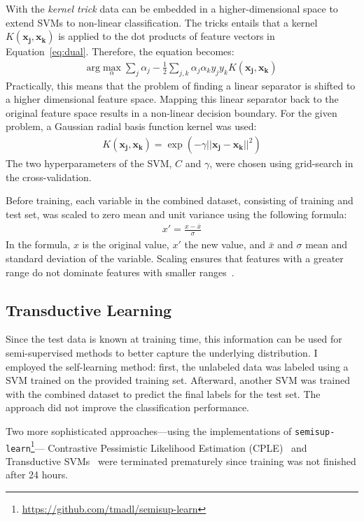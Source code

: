 \documentclass[a4paper,11pt]{article}
\begin{document}
With the \emph{kernel trick} data can be embedded in a
higher-dimensional space to extend SVMs to non-linear
classification. The tricks entails that a kernel
$K(\mathbf{x_j}, \mathbf{x_k})$ is applied to the dot products of
feature vectors in Equation~\ref{eq:dual}. Therefore, the equation
becomes:
\begin{align}
\label{eq:dualkernel}
  \text{arg}\max_\alpha\sum_j\alpha_j - \frac{1}{2}\sum_{j,k}\alpha_j\alpha_ky_jy_kK(\mathbf{x_j}, \mathbf{x_k})
\end{align} 
Practically, this means that the problem of finding a linear separator
is shifted to a higher dimensional feature space. Mapping this linear
separator back to the original feature space results in a non-linear
decision boundary.  For the given problem, a Gaussian radial basis
function kernel was used:
\begin{align}
K(\mathbf{x_j}, \mathbf{x_k}) = \exp(-\gamma||\mathbf{x_j} - \mathbf{x_k} ||^2)
\end{align}
The two hyperparameters of the SVM, $C$ and
$\gamma$,  were chosen using grid-search in the cross-validation.


Before training, each variable in the combined dataset, consisting of
training and test set, was scaled to zero mean and unit variance using
the following formula:
\begin{align}
  x' = \frac{x - \bar{x}}{\sigma}
\end{align}
In the formula, $x$ is the original value, $x'$ the new value, and
$\bar{x}$ and $\sigma$ mean and standard deviation of the
variable. Scaling ensures that features with a greater range do not
dominate features with smaller ranges~\cite{hsu2003practical}.

\subsection{Transductive Learning}

Since the test data is known at training time, this information can be
used for semi-supervised methods to better capture the underlying
distribution. I employed the self-learning method: first, the
unlabeled data was labeled using a SVM trained on the provided
training set. Afterward, another SVM was trained with the combined
dataset to predict the final labels for the test set. The approach did
not improve the classification performance.

Two more sophisticated approaches---using the implementations of
\texttt{semisup-learn}\footnote{\url{https://github.com/tmadl/semisup-learn}}---
Contrastive Pessimistic Likelihood Estimation
(CPLE)~\cite{loog2016contrastive} and Transductive
SVMs~\cite{bennett1999semi,gieseke2014fast} were terminated
prematurely since training was not finished after 24 hours.
\end{document}
